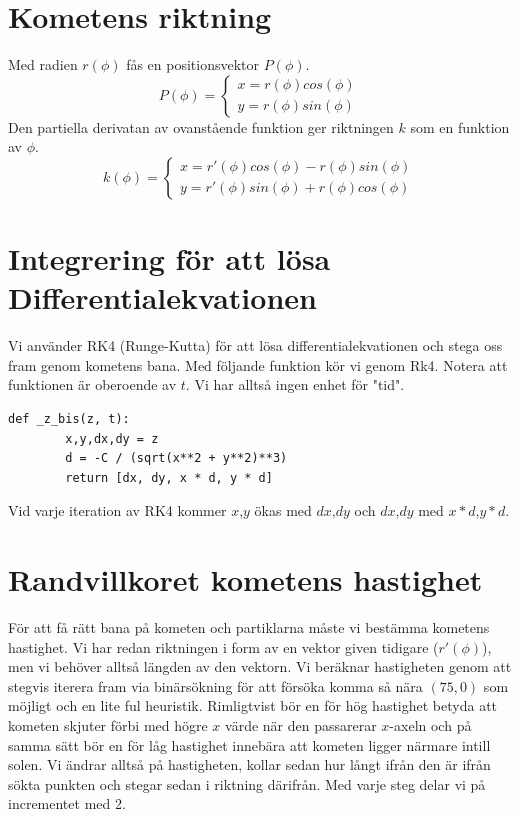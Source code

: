 \documentclass[11pt,twoside]{article}
\begin{document}
\section{Kometens riktning}
Med radien $r(\phi)$ fås en positionsvektor $P(\phi)$.
\begin{equation}
	P(\phi) = \begin{cases}
	x = r(\phi) cos(\phi) \\
	y = r(\phi) sin(\phi)
	\end{cases}
\end{equation}
Den partiella derivatan av ovanstående funktion ger riktningen $k$ som en funktion av $\phi$. 
\begin{equation}
	k(\phi) = \begin{cases}
	x = r'(\phi) cos(\phi) - r(\phi) sin(\phi) \\
	y = r'(\phi) sin(\phi) + r(\phi) cos(\phi)
	\end{cases}
\end{equation}

\section{Integrering för att lösa Differentialekvationen}
Vi använder RK4 (Runge-Kutta) för att lösa differentialekvationen och stega oss fram genom kometens bana. Med följande funktion kör vi genom Rk4. Notera att funktionen är oberoende av $t$. 
Vi har alltså ingen enhet för "tid".

\begin{lstlisting}
def _z_bis(z, t):
		x,y,dx,dy = z				
		d = -C / (sqrt(x**2 + y**2)**3)
		return [dx, dy, x * d, y * d]
\end{lstlisting}

Vid varje iteration av RK4 kommer $x$,$y$ ökas med $dx$,$dy$ och $dx$,$dy$ med $x*d$,$y*d$.

\section{Randvillkoret kometens hastighet}
För att få rätt bana på kometen och partiklarna måste vi bestämma kometens hastighet. Vi har redan riktningen i form av en vektor given tidigare ($r'(\phi)$), men vi behöver alltså längden av den vektorn.
Vi beräknar hastigheten genom att stegvis iterera fram via binärsökning för att försöka komma så nära $(75,0)$ som möjligt och en lite ful heuristik. Rimligtvist bör en för hög hastighet betyda att kometen skjuter förbi med högre $x$ värde när den passarerar $x$-axeln och på samma sätt bör en för låg hastighet innebära att kometen ligger närmare intill solen.
Vi ändrar alltså på hastigheten, kollar sedan hur långt ifrån den är ifrån sökta punkten och stegar sedan i riktning därifrån. Med varje steg delar vi på incrementet med 2. 
\end{document}

